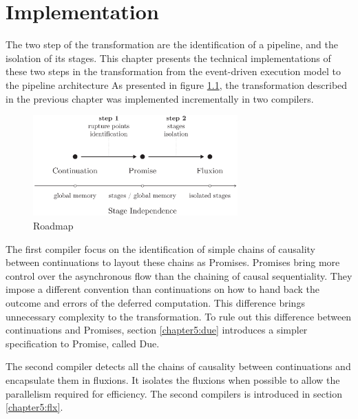 \chapter{Implementation} \label{chapter5}
\minitoc
\eject

The two step of the transformation are the identification of a pipeline, and the isolation of its stages.
This chapter presents the technical implementations of these two steps in the transformation from the event-driven execution model to the pipeline architecture
As presented in figure \ref{fig:roadmap}, the transformation described in the previous chapter was implemented incrementally in two compilers.

\begin{figure}[h!]
\begin{center}
\includegraphics[width=0.7\textwidth]{../resources/roadmap.pdf}
\end{center}
\caption{Roadmap}
\label{fig:roadmap}
\end{figure}

The first compiler focus on the identification of simple chains of causality between continuations to layout these chains as Promises.
Promises bring more control over the asynchronous flow than the chaining of causal sequentiality.
They impose a different convention than continuations on how to hand back the outcome and errors of the deferred computation.
This difference brings unnecessary complexity to the transformation.
To rule out this difference between continuations and Promises, section \ref{chapter5:due} introduces a simpler specification to Promise, called Due.

The second compiler detects all the chains of causality between continuations and encapsulate them in fluxions.
It isolates the fluxions when possible to allow the parallelism required for efficiency.
The second compilers is introduced in section \ref{chapter5:flx}.



